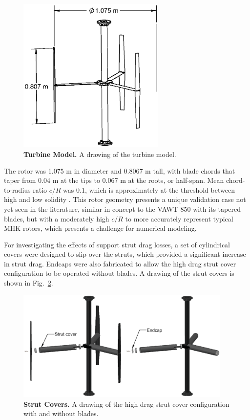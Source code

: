 \documentclass[10pt,letterpaper]{article}
\begin{document}
\begin{figure}[h]
    \includegraphics[width=0.65\textwidth]{figures/turbine.eps}

    \caption{{\bf Turbine Model.} A drawing of the turbine model.}

    \label{fig:turbine-drawing}
\end{figure}

The rotor was 1.075 m in diameter and 0.8067 m tall, with blade chords that
taper from 0.04 m at the tips to 0.067 m at the roots, or half-span. Mean
chord-to-radius ratio $c/R$ was 0.1, which is approximately at the threshold
between high and low solidity \cite{Strickland1981,Fiedler2009}. This rotor
geometry presents a unique validation case not yet seen in the literature,
similar in concept to the VAWT 850 \cite{Mays1990} with its tapered blades, but
with a moderately high $c/R$ to more accurately represent typical MHK rotors,
which presents a challenge for numerical modeling.

For investigating the effects of support strut drag losses, a set of cylindrical
covers were designed to slip over the struts, which provided a significant
increase in strut drag. Endcaps were also fabricated to allow the high drag
strut cover configuration to be operated without blades. A drawing of the strut
covers is shown in Fig.~\ref{fig:covers}.

\begin{figure}[h]
    \includegraphics[width=0.95\textwidth]{figures/strut_covers.eps}
    
    \caption{{\bf Strut Covers.} A drawing of the high drag strut cover
        configuration with and without blades.}
    
    \label{fig:covers}
\end{figure}
\end{document}
